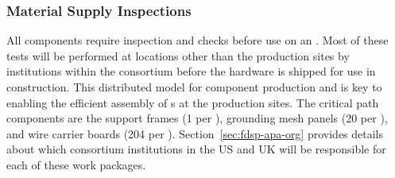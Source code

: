 \subsubsection{Material Supply Inspections}


All components require inspection and  checks before use on an .  Most of these tests will be performed at locations other than the  production sites by institutions within the consortium before the hardware is shipped for use in  construction. This distributed model for component production and  is key to enabling the efficient assembly of s at the production sites.   The critical path components are the support frames (1 per ), grounding mesh panels (20 per ), and wire carrier boards (204 per ). Section~\ref{sec:fdsp-apa-org} provides details about which consortium institutions in the US and UK will be responsible for each of these work packages.  

\begin{comment}
\begin{itemize}

\item Wire testing: The CuBe wire is provided on spools from the supplier. Samples from each spool are strength tested before use on an \dword{apa}.

\item Circuit boards: All circuit boards installed on an \dword{apa} are inspected for dimensional accuracy before being routed through various epoxy and cleaning processes as they are prepped for assembly. Inspection results are documented, and if anomalies are found, an electronic non-conformance report is written.  %

\item \dword{cr} and $G$-plane bias board testing: Acceptance tests of these boards include leakage current measurements ($<$\SI{0.5}{nA}) and continuity tests on each channel.  The tests are performed at room temperature. \dword{pdsp} was used to perform design validation on more than \num{100} boards that were cycled and tested at \lntwo temperature. No failures were seen during these tests. 
\end{itemize}
\end{comment}

